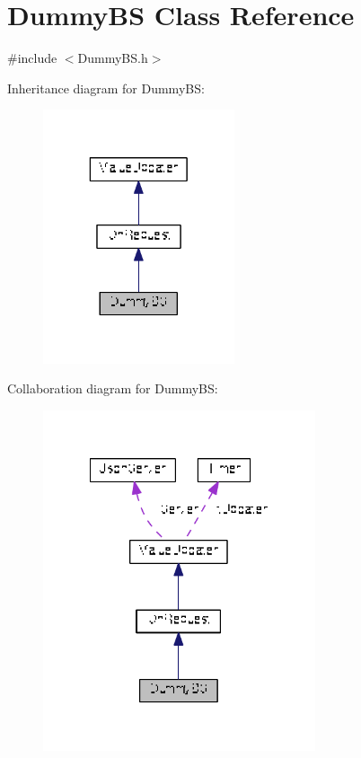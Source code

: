 \hypertarget{class_dummy_b_s}{\section{Dummy\+B\+S Class Reference}
\label{class_dummy_b_s}
}


{\ttfamily \#include $<$Dummy\+B\+S.\+h$>$}



Inheritance diagram for Dummy\+B\+S\+:
\nopagebreak
\begin{figure}[H]
\begin{center}
\leavevmode
\includegraphics[width=160pt]{class_dummy_b_s__inherit__graph}
\end{center}
\end{figure}


Collaboration diagram for Dummy\+B\+S\+:
\nopagebreak
\begin{figure}[H]
\begin{center}
\leavevmode
\includegraphics[width=227pt]{class_dummy_b_s__coll__graph}
\end{center}
\end{figure}
